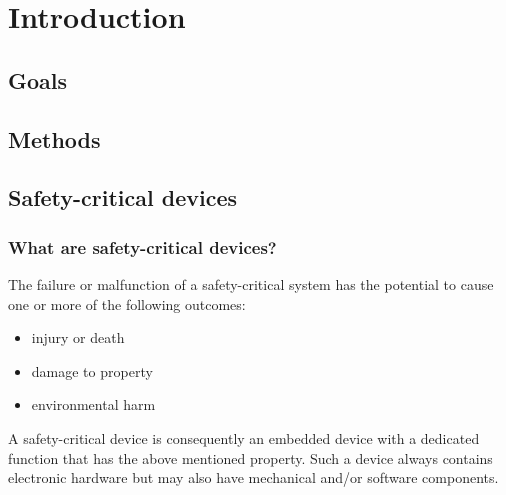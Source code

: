 
\chapter{Introduction} %

\label{Chapter1} %


\newcommand{\keyword}[1]{\textbf{#1}}
\newcommand{\tabhead}[1]{\textbf{#1}}
\newcommand{\code}[1]{\texttt{#1}}
\newcommand{\file}[1]{\texttt{\bfseries#1}}
\newcommand{\option}[1]{\texttt{\itshape#1}}

\newcommand{\mfg}{manufacturer}
\newcommand{\gls}{}

\section{Goals}


\section{Methods}


\section{Safety-critical devices}
\subsection{What are safety-critical devices?}
The failure or malfunction of a safety-critical system has the potential to cause one or more of the following outcomes:
\begin{itemize}
\item injury or death
\item damage to property
\item environmental harm
\end{itemize}
A safety-critical device is consequently an embedded device with a dedicated function that has the above mentioned property. Such a device always contains electronic hardware but may also have mechanical and/or software components.

